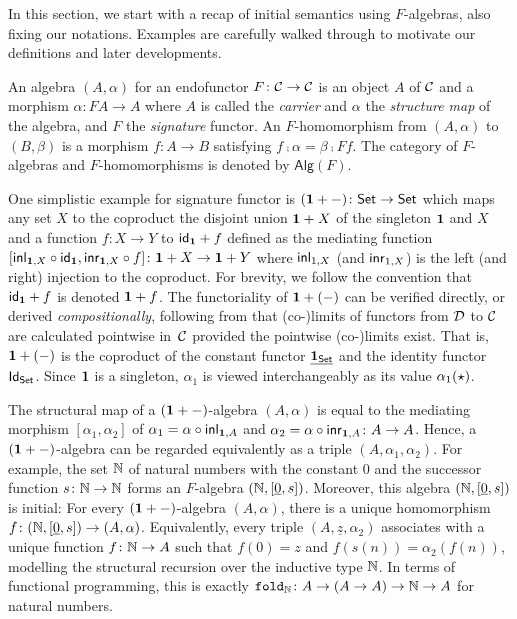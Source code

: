 \documentclass[acmsmall,review]{acmart}\settopmatter{printfolios=true,printccs=false,printacmref=false}
\theoremstyle{acmdefinition}
\begin{document}
In this section, we start with a recap of initial semantics using $F$-algebras, also fixing our notations.
Examples are carefully walked through to motivate our definitions and later developments.

\begin{definition}
  An algebra $(A, \alpha)$ for an endofunctor $F\colon \catC \to \catC$ is an object $A$ of $\catC$ and a morphism $\alpha \colon FA \to A$ where $A$ is called the \emph{carrier} and $\alpha$ the \emph{structure map}
  of the algebra, and $F$ the \emph{signature} functor. 
  An $F$-homomorphism from $(A, \alpha)$ to $(B, \beta)$ is a morphism $f\colon A \to B$ satisfying $f \comp \alpha = \beta \comp Ff$.
  The category of $F$-algebras and $F$-homomorphisms is denoted by $\mathsf{Alg}(F)$. 
\end{definition}
One simplistic example for signature functor is $(\Unit + \blank)\colon \set \to \set$ which maps any set $X$ to the coproduct the disjoint union $\Unit + X$ of the singleton $\Unit$ and $X$ and a function $f\colon X \to Y$ to $\idfunc[\Unit] + f$ defined as the mediating function $[\inl_{\Unit, X} \circ \idfunc[\Unit], \inr_{\Unit, X} \circ f]\colon \Unit + X \to \Unit + Y$ where $\inl_{1, X}$ (and $\inr_{1, X}$) is the left (and right) injection to the coproduct. 
For brevity, we follow the convention that $\idfunc[\Unit] + f$ is denoted $\Unit + f$.
The functoriality of $\Unit + (\blank)$ can be verified directly, or derived \emph{compositionally}, following from that (co-)limits of functors from $\catD$ to $\catC$ are calculated pointwise in~$\catC$ provided the pointwise (co-)limits exist.
That is, $\Unit + (\blank)$ is the coproduct of the constant functor $\underline{\Unit_{\set}}$ and the identity functor~$\Id[\set]$.
Since $\Unit$ is a singleton, $\alpha_1$ is viewed interchangeably as its value $\alpha_1(\ttt)$. 

The structural map of a $(\Unit + \blank)$-algebra $(A, \alpha)$ is equal to the mediating morphism $[\alpha_1, \alpha_2]$ of $\alpha_1 = \alpha \comp \inl_{\Unit, A}$ and $\alpha_2 = \alpha \comp \inr_{\Unit, A} \colon A \to A$.
Hence, a $(\Unit + \blank)$-algebra can be regarded equivalently as a triple $(A, \alpha_1, \alpha_2)$. 
For example, the set $\Nat$ of natural numbers with the constant $0$ and the successor function $s\colon \Nat \to \Nat$ forms an $F$-algebra $(\Nat, [\underline{0}, s])$.
Moreover, this algebra $(\Nat, [\underline{0}, s])$ is initial:
For every $(\Unit + \blank)$-algebra $(A, \alpha)$, there is a unique homomorphism $f\colon (\Nat, [\underline{0}, s]) \to (A, \alpha)$.
Equivalently, every triple $(A, \underline{z}, \alpha_2)$ associates with
a unique function $f\colon \Nat \to A$ such that $f(0) = z$ and $f(s(n)) = \alpha_2 (f(n))$, modelling the structural recursion over the inductive type $\Nat$.
In terms of functional programming, this is exactly $\mathtt{fold}_{\Nat}\colon A \to (A \to A) \to \Nat \to A$ for natural numbers.
\end{document}
